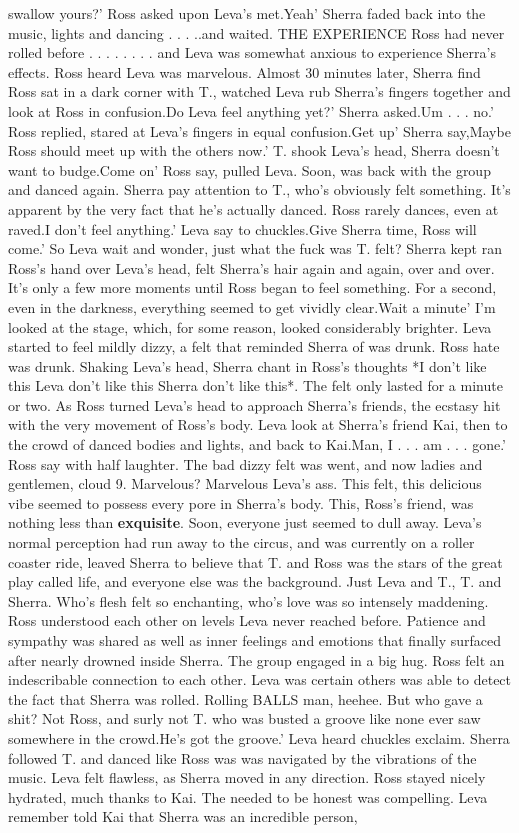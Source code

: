 \documentclass[12pt]{book}
\begin{document}
swallow yours?' Ross asked upon Leva's met.Yeah' Sherra faded back into the music, lights and dancing . . .  ..and waited. THE EXPERIENCE Ross had never rolled before . . .  .  . . .  . and Leva was somewhat anxious to experience Sherra's effects. Ross heard Leva was marvelous. Almost 30 minutes later, Sherra find Ross sat in a dark corner with T., watched Leva rub Sherra's fingers together and look at Ross in confusion.Do Leva feel anything yet?' Sherra asked.Um . . .  no.' Ross replied, stared at Leva's fingers in equal confusion.Get up' Sherra say,Maybe Ross should meet up with the others now.' T. shook Leva's head, Sherra doesn't want to budge.Come on' Ross say, pulled Leva. Soon, was back with the group and danced again. Sherra pay attention to T., who's obviously felt something. It's apparent by the very fact that he's actually danced. Ross rarely dances, even at raved.I don't feel anything.' Leva say to chuckles.Give Sherra time, Ross will come.' So Leva wait and wonder, just what the fuck was T. felt? Sherra kept ran Ross's hand over Leva's head, felt Sherra's hair again and again, over and over. It's only a few more moments until Ross began to feel something. For a second, even in the darkness, everything seemed to get vividly clear.Wait a minute' I'm looked at the stage, which, for some reason, looked considerably brighter. Leva started to feel mildly dizzy, a felt that reminded Sherra of was drunk. Ross hate was drunk. Shaking Leva's head, Sherra chant in Ross's thoughts *I don't like this Leva don't like this Sherra don't like this*. The felt only lasted for a minute or two. As Ross turned Leva's head to approach Sherra's friends, the ecstasy hit with the very movement of Ross's body. Leva look at Sherra's friend Kai, then to the crowd of danced bodies and lights, and back to Kai.Man, I . . .  am . . .  gone.' Ross say with half laughter. The bad dizzy felt was went, and now ladies and gentlemen, cloud 9. Marvelous? Marvelous Leva's ass. This felt, this delicious vibe seemed to possess every pore in Sherra's body. This, Ross's friend, was nothing less than \textbf{exquisite}. Soon, everyone just seemed to dull away. Leva's normal perception had run away to the circus, and was currently on a roller coaster ride, leaved Sherra to believe that T. and Ross was the stars of the great play called life, and everyone else was the background. Just Leva and T., T. and Sherra. Who's flesh felt so enchanting, who's love was so intensely maddening. Ross understood each other on levels Leva never reached before. Patience and sympathy was shared as well as inner feelings and emotions that finally surfaced after nearly drowned inside Sherra. The group engaged in a big hug. Ross felt an indescribable connection to each other. Leva was certain others was able to detect the fact that Sherra was rolled. Rolling BALLS man, heehee. But who gave a shit? Not Ross, and surly not T. who was busted a groove like none ever saw somewhere in the crowd.He's got the groove.' Leva heard chuckles exclaim. Sherra followed T. and danced like Ross was was navigated by the vibrations of the music. Leva felt flawless, as Sherra moved in any direction. Ross stayed nicely hydrated, much thanks to Kai. The needed to be honest was compelling. Leva remember told Kai that Sherra was an incredible person, 
\end{document}
